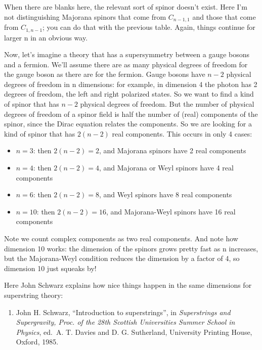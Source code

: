 \documentclass{article}
\def\tightlist{}
\begin{document}
When there are blanks here, the relevant sort of spinor doesn't exist.
Here I'm not distinguishing Majorana spinors that come from
\(C_{n-1,1}\) and those that come from \(C_{1,n-1}\); you can do that
with the previous table. Again, things continue for larger n in an
obvious way.

Now, let's imagine a theory that has a supersymmetry between a gauge
bosons and a fermion. We'll assume there are as many physical degrees of
freedom for the gauge boson as there are for the fermion. Gauge bosons
have \(n - 2\) physical degrees of freedom in n dimensions: for example,
in dimension 4 the photon has 2 degrees of freedom, the left and right
polarized states. So we want to find a kind of spinor that has \(n - 2\)
physical degrees of freedom. But the number of physical degrees of
freedom of a spinor field is half the number of (real) components of the
spinor, since the Dirac equation relates the components. So we are
looking for a kind of spinor that has \(2(n - 2)\) real components. This
occurs in only 4 cases:

\begin{itemize}
\item
  \(n = 3\): then \(2(n-2) = 2\), and Majorana spinors have 2 real
  components
\item
  \(n = 4\): then \(2(n-2) = 4\), and Majorana or Weyl spinors have 4
  real components
\item
  \(n = 6\): then \(2(n-2) = 8\), and Weyl spinors have 8 real
  components
\item
  \(n = 10\): then \(2(n-2) = 16\), and Majorana-Weyl spinors have 16
  real components
\end{itemize}

Note we count complex components as two real components. And note how
dimension 10 works: the dimension of the spinors grows pretty fast as n
increases, but the Majorana-Weyl condition reduces the dimension by a
factor of 4, so dimension 10 just squeaks by!

Here John Schwarz explains how nice things happen in the same dimensions
for superstring theory:

\begin{enumerate}
\def\labelenumi{\arabic{enumi})}
\setcounter{enumi}{3}
\tightlist
\item
  John H. Schwarz, ``Introduction to superstrings'', in
  \emph{Superstrings and Supergravity, Proc. of the 28th Scottish
  Universities Summer School in Physics}, ed.~A. T. Davies and D. G.
  Sutherland, University Printing House, Oxford, 1985.
\end{enumerate}
\end{document}
